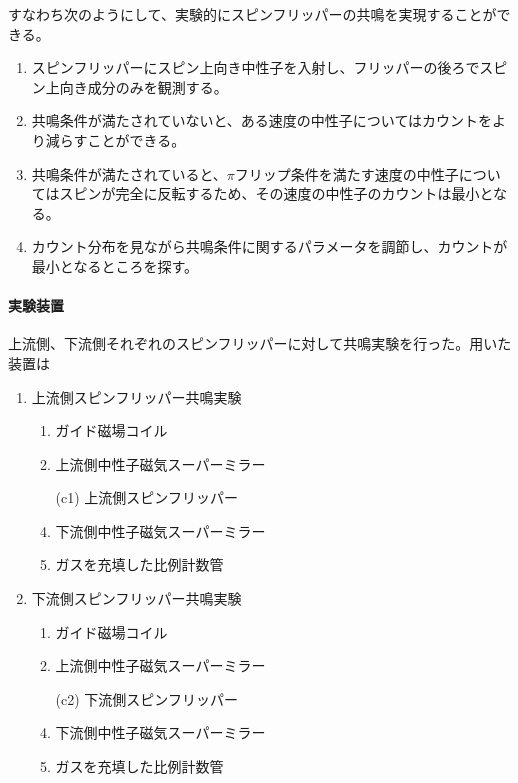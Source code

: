 すなわち次のようにして、実験的にスピンフリッパーの共鳴を実現することができる。
\begin{enumerate}
\item スピンフリッパーにスピン上向き中性子を入射し、フリッパーの後ろでスピン上向き成分のみを観測する。
\item 共鳴条件が満たされていないと、ある速度の中性子についてはカウントをより減らすことができる。
\item 共鳴条件が満たされていると、$\pi$フリップ条件を満たす速度の中性子についてはスピンが完全に反転するため、その速度の中性子のカウントは最小となる。
\item カウント分布を見ながら共鳴条件に関するパラメータを調節し、カウントが最小となるところを探す。
\end{enumerate}


\paragraph{実験装置}
上流側、下流側それぞれのスピンフリッパーに対して共鳴実験を行った。用いた装置は
\vspace{5mm}
\begin{minipage}{0.5\hsize}
\begin{enumerate}
\item 上流側スピンフリッパー共鳴実験
\begin{enumerate}
\item ガイド磁場コイル
\item 上流側中性子磁気スーパーミラー
\item[(c1)] 上流側スピンフリッパー
\setcounter{enumii}{3}
\item 下流側中性子磁気スーパーミラー
\item {}ガスを充填した比例計数管
\end{enumerate}
\end{enumerate}
\end{minipage}
\begin{minipage}{0.5\hsize}
\begin{enumerate}
\setcounter{enumi}{1}
\item 下流側スピンフリッパー共鳴実験
\begin{enumerate}
\item ガイド磁場コイル
\item 上流側中性子磁気スーパーミラー
\item[(c2)] 下流側スピンフリッパー
\setcounter{enumii}{3}
\item 下流側中性子磁気スーパーミラー
\item {}ガスを充填した比例計数管
\end{enumerate}
\end{enumerate}
\end{minipage}
\vspace{5mm}

